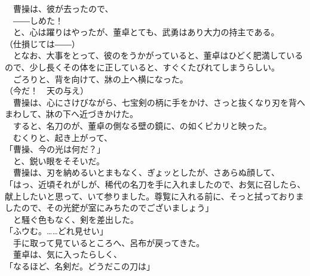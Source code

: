 \documentclass[
  paper=a5,
  fontsize=10pt,
  jafontsize=9.5pt,
  tate,                  %
  open_bracket_pos=nibu, %
]{jlreq}
\begin{document}
　曹操は、彼が去ったので、\\


　――しめた！\\


　と、心は躍りはやったが、董卓とても、武勇はあり大力の持主である。\\


（仕損じては――）\\


　となお、大事をとって、彼のをうかがっていると、董卓はひどく肥満しているので、少し長くその体をに正していると、すぐくたびれてしまうらしい。\\


　ごろりと、背を向けて、牀の上へ横になった。\\


（今だ！　天の与え）\\


　曹操は、心にさけびながら、七宝剣の柄に手をかけ、さっと抜くなり刃を背へまわして、牀の下へ近づきかけた。\\


　すると、名刀のが、董卓の側なる壁の鏡に、の如くピカリと映った。\\


　むくりと、起き上がって、\\


「曹操、今の光は何だ？」\\


　と、鋭い眼をそそいだ。\\


　曹操は、刃を納めるいとまもなく、ぎょッとしたが、さあらぬ顔して、\\


「はっ、近頃それがしが、稀代の名刀を手に入れましたので、お気に召したら、献上したいと思って、いて参りました。尊覧に入れる前に、そっと拭っておりましたので、その光鋩が室にみちたのでございましょう」\\


　と騒ぐ色もなく、剣を差出した。\\


「ふウむ。……どれ見せい」\\


　手に取って見ているところへ、呂布が戻ってきた。\\


　董卓は、気に入ったらしく、\\


「なるほど、名剣だ。どうだこの刀は」\\
\end{document}
